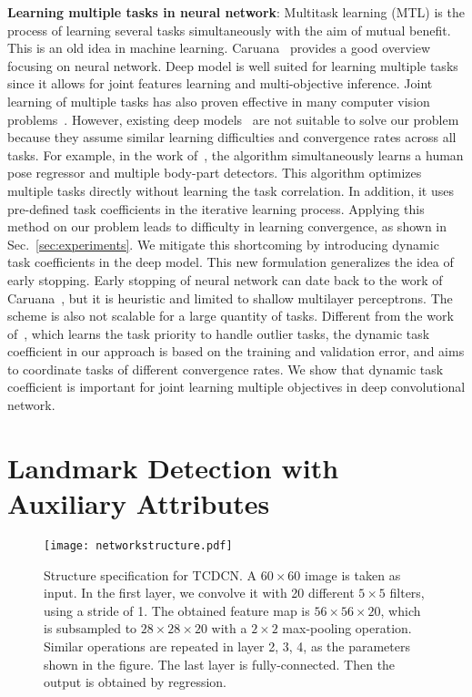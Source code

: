 \documentclass[10pt,journal,compsoc]{IEEEtran}
\begin{document}
\noindent \textbf{Learning multiple tasks in neural network}:
Multitask learning (MTL) is the process of learning several tasks simultaneously with the aim of mutual benefit. This is an old idea in machine learning. Caruana~\cite{caruana1997multitask} provides a good overview focusing on neural network.
Deep model is well suited for learning multiple tasks since it allows for joint features learning and multi-objective inference. Joint learning of multiple tasks has also proven effective in many computer vision problems~\cite{ahmed2008training,weston2012deep,ABC}. However, existing deep models~\cite{collobert2008unified,ahmed2008training} are not suitable to solve our problem because they assume similar learning difficulties and convergence rates across all tasks. For example, in the work of~\cite{ABC}, the algorithm simultaneously learns a human pose regressor and multiple body-part detectors. This algorithm optimizes multiple tasks directly without learning the task correlation. In addition, it uses pre-defined task coefficients in the iterative learning process. Applying this method on our problem leads to difficulty in learning convergence, as shown in Sec.~\ref{sec:experiments}. We mitigate this shortcoming by introducing dynamic task coefficients in the deep model. This new formulation generalizes the idea of early stopping. Early stopping of neural network can date back to the work of Caruana~\cite{caruana1997multitask}, but it is heuristic and  limited to shallow multilayer perceptrons. The scheme is also not scalable for a large quantity of tasks. Different from the work of~\cite{6753948}, which learns the task priority to handle outlier tasks, the dynamic task coefficient in our approach is based on the training and validation error, and aims to coordinate tasks of different convergence rates. We show that dynamic task coefficient is important for joint learning multiple objectives in deep convolutional network.





\section{Landmark Detection with Auxiliary Attributes}
\label{sec: TC-CNN1}
\begin{figure*}
  \centering
  \texttt{[image: networkstructure.pdf]}\\
  \caption{Structure specification for TCDCN. A $60\times60$ image is taken as input. In the first layer, we convolve it with 20 different $5\times5$ filters, using a stride of 1. The obtained feature map is $56\times56\times20$, which is subsampled to $28\times28\times20$ with a $2\times2$ max-pooling operation. Similar operations are repeated in layer 2, 3, 4, as the parameters shown in the figure. The last layer is fully-connected. Then the output is obtained by regression.}

  \label{fig:networkstructure}
\end{figure*}
\end{document}
